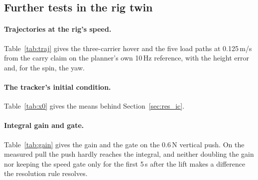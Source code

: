 \subsection{Further tests in the rig twin}
\label{sec:app_tests}

\paragraph{Trajectories at the rig's speed.} Table~\ref{tab:traj} gives the three-carrier hover and the five load
paths at 0.125\,m/s from the carry claim on the planner's own 10\,Hz reference, with the height error and, for the
spin, the yaw.
\begin{table}[htbp]
\centering
\caption[Trajectories at the rig's speed]{Trajectories in the rig twin at 0.125\,m/s peak path speed: three
carriers, ring at 1.0\,m, floor start, the default controller, two runs each from the carry claim (the hover from the
model-error study's baseline). Horizontal error per sample against the planner's reference at its 10\,Hz updates, over
the motion (the orbit's first lap) or the 15\,s before LAND (hover); height error and tilt: means over the same window.
The circle starts from the lift point; the orbit is flown continuously.}
\label{tab:traj}

\end{table}

\paragraph{The tracker's initial condition.} Table~\ref{tab:x0} gives the means behind Section~\ref{sec:res_ic}.
\begin{table}[h]
\centering
\caption{Ring error with the relaxed and the pinned initial condition, no integral action, on the freeze code tree
(two runs each).}
\label{tab:x0}

\end{table}

\paragraph{Integral gain and gate.} Table~\ref{tab:gain} gives the gain and the gate on the 0.6\,N vertical push. On
the measured pull the push hardly reaches the integral, and neither doubling the gain nor keeping the speed gate only
for the first 5\,s after the lift makes a difference the resolution rule resolves.
\begin{table}[h]
\centering
\caption{Integral gain and gate on the 0.6\,N vertical push, model integral, the measured pull. Peak: largest
displacement during the push; overshoot and settling (to within 1\,cm): after it ends. Brackets: number of runs.}
\label{tab:gain}

\end{table}

